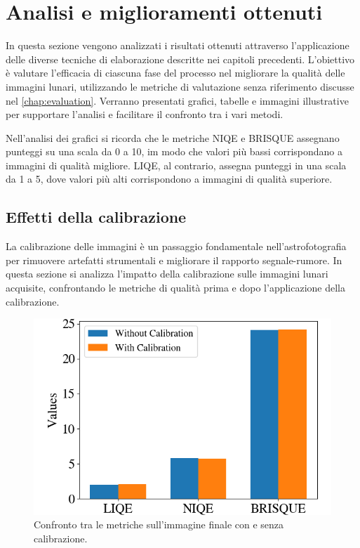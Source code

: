 \section{Analisi e miglioramenti ottenuti} \label{sec:analysis}

In questa sezione vengono analizzati i risultati ottenuti attraverso l'applicazione delle diverse tecniche di elaborazione descritte nei capitoli precedenti. L'obiettivo è valutare l'efficacia di ciascuna fase del processo nel migliorare la qualità delle immagini lunari, utilizzando le metriche di valutazione senza riferimento discusse nel \cref{chap:evaluation}. Verranno presentati grafici, tabelle e immagini illustrative per supportare l'analisi e facilitare il confronto tra i vari metodi.

Nell'analisi dei grafici si ricorda che le metriche NIQE e BRISQUE assegnano punteggi su una scala da 0 a 10, im modo che valori più bassi corrispondano a immagini di qualità migliore. LIQE, al contrario, assegna punteggi in una scala da 1 a 5, dove valori più alti corrispondono a immagini di qualità superiore.

\subsection{Effetti della calibrazione} \label{subsec:analysis_cal}

La calibrazione delle immagini è un passaggio fondamentale nell'astrofotografia per rimuovere artefatti strumentali e migliorare il rapporto segnale-rumore. In questa sezione si analizza l'impatto della calibrazione sulle immagini lunari acquisite, confrontando le metriche di qualità prima e dopo l'applicazione della calibrazione.

\begin{figure}[H]
    \centering
    \includegraphics[scale = 0.475]{../assets/calibration_effect.png}
    \caption{Confronto tra le metriche sull'immagine finale con e senza calibrazione.}
    \label{fig:confronto-calibrazione}
\end{figure}

